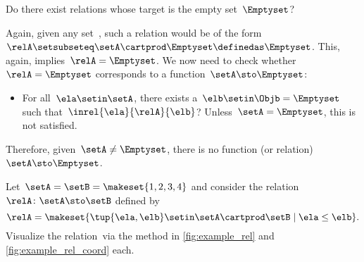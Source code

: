 \begin{exercise}
    Do there exist relations whose target is the empty set~$\Emptyset$?
\end{exercise}
\begin{solution}
    Again, given any set~\setA, such a relation would be of the form~$\relA \setsubseteq \setA \cartprod \Emptyset\definedas \Emptyset$.
    This, again, implies~$\relA=\Emptyset$.
    We now need to check whether~$\relA=\Emptyset$ corresponds to a function~$\setA \sto \Emptyset$:
    \begin{itemize}
        \item For all~$\ela\setin \setA$, there exists a~$\elb\setin \Objb=\Emptyset$ such that~$\inrel{\ela}{\relA}{\elb}$?
              Unless~$\setA=\Emptyset$, this is not satisfied.
    \end{itemize}
    Therefore, given~$\setA \neq \Emptyset$, there is no function (or relation)~$\setA \sto \Emptyset$.
\end{solution}

\vfill
\begin{gradedexercise}
    \label{ex:visualize-leq-relation}
    Let~$\setA = \setB = \makeset{1, 2, 3, 4 }$ and consider the relation~$\relA \colon \setA \sto  \setB$ defined by
    \begin{equation}
        \relA = \makeset{ \tup{\ela,\elb} \setin \setA \cartprod \setB \mid \ela \leq \elb }.
    \end{equation}
    Visualize the relation~\relA via the method in \cref{fig:example_rel} and \cref{fig:example_rel_coord} each.
\end{gradedexercise}

